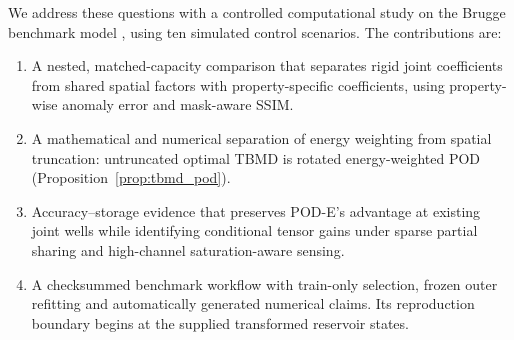 We address these questions with a controlled computational study on the Brugge benchmark model \cite{peters2010brugge}, using ten simulated control scenarios. The contributions are:
\begin{enumerate}[label=(\arabic*),leftmargin=*]
\item A nested, matched-capacity comparison that separates rigid joint coefficients from shared spatial factors with property-specific coefficients, using property-wise anomaly error and mask-aware SSIM.
\item A mathematical and numerical separation of energy weighting from spatial truncation: untruncated optimal TBMD is rotated energy-weighted POD (Proposition~\ref{prop:tbmd_pod}).
\item Accuracy--storage evidence that preserves POD-E's advantage at existing joint wells while identifying conditional tensor gains under sparse partial sharing and high-channel saturation-aware sensing.
\item A checksummed benchmark workflow with train-only selection, frozen outer refitting and automatically generated numerical claims. Its reproduction boundary begins at the supplied transformed reservoir states.
\end{enumerate}
